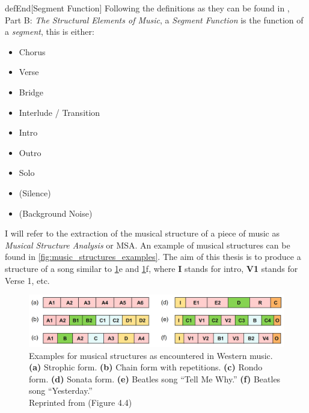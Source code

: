 \begin{theoremEnd}[restate,category=def]{defEnd}[Segment Function]
    \label{def:segment_function}
    Following the definitions as they can be found in \textcite{Benward1997music}, Part B: \textit{The Structural Elements of Music}, a \textit{Segment Function} is the function of a \textit{segment}, this is either:
    \begin{itemize}[noitemsep]
        \item Chorus
        \item Verse
        \item Bridge
        \item Interlude / Transition
        \item Intro
        \item Outro
        \item Solo
        \item (Silence)
        \item (Background Noise)
    \end{itemize}
\end{theoremEnd}

I will refer to the extraction of the musical structure of a piece of music as \textit{Musical Structure Analysis} or MSA. An example of musical structures can be found in \autoref{fig:music_structures_examples}. The aim of this thesis is to produce a structure of a song similar to \ref{fig:music_structures_examples}e and \ref{fig:music_structures_examples}f, where \textbf{I} stands for intro, \textbf{V1} stands for Verse 1, etc.

\begin{figure}[t]
    \centering
    \includegraphics[width=1\textwidth]{images/music_structures_examples}
    \caption{Examples for musical structures as encountered in Western music. \textbf{(a)} Strophic form. \textbf{(b)} Chain form with repetitions. \textbf{(c)} Rondo form. \textbf{(d)} Sonata form. \textbf{(e)} Beatles song “Tell Me Why.” \textbf{(f)} Beatles song “Yesterday.”\\
    Reprinted from \textcite[p. 173]{Muller} (Figure 4.4)}
    \label{fig:music_structures_examples}
\end{figure}


